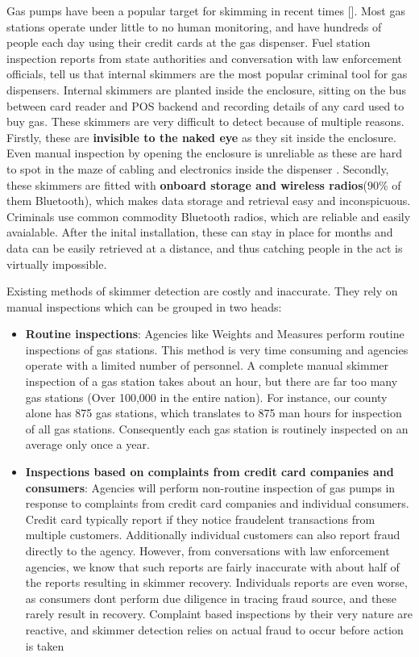 Gas pumps have been a popular target for skimming in recent times []. Most gas stations operate under little to no human monitoring, and have hundreds of people each day using their credit cards at the gas dispenser. Fuel station inspection reports from state authorities  and conversation with law enforcement officials, tell us that internal skimmers are the most popular criminal tool for gas dispensers. Internal skimmers are planted inside the enclosure, sitting on the bus between card reader and POS backend and recording details of any card used to buy gas. These skimmers are very difficult to detect because of multiple reasons. Firstly, these are \textbf{invisible to the naked eye} as they sit inside the enclosure. Even manual inspection by opening the enclosure is unreliable as these are hard to spot in the maze of cabling and electronics inside the dispenser . Secondly, these skimmers are fitted with \textbf{onboard storage and wireless radios}(90\% of them Bluetooth), which makes data storage and retrieval easy and inconspicuous. Criminals use common commodity Bluetooth radios, which are reliable and easily avaialable. After the inital installation, these can stay in place for months and data can be easily retrieved at a distance, and thus catching people in the act is virtually impossible. 

Existing methods of skimmer detection are costly and inaccurate. They rely on manual inspections which can be grouped in two heads:
\begin{itemize}
	\item \textbf{Routine inspections}: Agencies like Weights and Measures perform routine inspections of gas stations. This method is very time consuming and agencies operate with a limited number of personnel. A complete manual skimmer inspection of a gas station takes about an hour, but there are far too many gas stations (Over 100,000 in the entire nation). For instance, our county alone has 875 gas stations, which translates to 875 man hours for inspection of all gas stations. Consequently each gas station is routinely inspected on an average only once a year.
	\item \textbf{Inspections based on complaints from credit card companies and consumers}: Agencies will perform non-routine inspection of gas pumps in response to complaints from credit card companies and individual consumers. Credit card typically report if they notice fraudelent transactions from multiple customers. Additionally individual customers can also report fraud directly to the agency. However, from conversations with law enforcement agencies, we know that such reports are fairly inaccurate with about half of the reports resulting in skimmer recovery. Individuals reports are even worse, as consumers dont perform due diligence in tracing fraud source, and these rarely result in recovery. Complaint based inspections by their very nature are reactive, and skimmer detection relies on actual fraud to occur before action is taken
\end{itemize}

